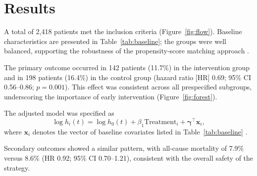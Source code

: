 \section{Results}
\label{sec:results}

A total of 2,418 patients met the inclusion criteria (Figure~\ref{fig:flow}). Baseline characteristics are presented in Table~\ref{tab:baseline}; the groups were well balanced, supporting the robustness of the propensity-score matching approach \cite{austin2011introduction}.

The primary outcome occurred in 142 patients (11.7\%) in the intervention group and in 198 patients (16.4\%) in the control group (hazard ratio [HR] 0.69; 95\% CI 0.56--0.86; $p = 0.001$). This effect was consistent across all prespecified subgroups, underscoring the importance of early intervention (Figure~\ref{fig:forest}).

The adjusted model was specified as
\begin{equation}
  \log h_i(t) = \log h_0(t) + \beta_1 \text{Treatment}_i + \boldsymbol{\gamma}^\top \mathbf{x}_i ,
  \label{eq:cox}
\end{equation}
where $\mathbf{x}_i$ denotes the vector of baseline covariates listed in Table~\ref{tab:baseline} \cite{cox1972regression, therneau2000modeling}.

Secondary outcomes showed a similar pattern, with all-cause mortality of 7.9\% versus 8.6\% (HR 0.92; 95\% CI 0.70--1.21), consistent with the overall safety of the strategy.
